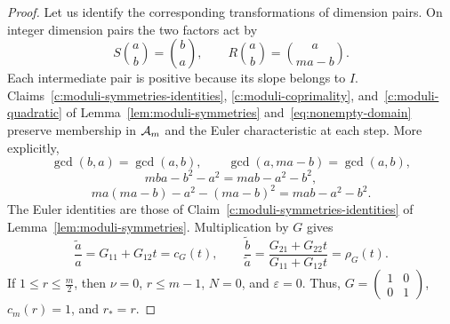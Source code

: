 \begin{proof}
Let us identify the corresponding transformations of dimension pairs.
On integer dimension pairs the two factors act by
\[
 S\binom ab=\binom ba,\qquad
 R\binom ab=\binom a{ma-b}.
\]
Each intermediate pair is positive because its slope belongs to $I$. Claims~\ref{c:moduli-symmetries-identities}, \ref{c:moduli-coprimality}, and~\ref{c:moduli-quadratic} of Lemma~\ref{lem:moduli-symmetries} and~\eqref{eq:nonempty-domain} preserve membership in $\mathcal A_m$ and the Euler characteristic at each step. More explicitly,
\[
 \gcd(b,a)=\gcd(a,b),\qquad \gcd(a,ma-b)=\gcd(a,b),
\]
\[
 m ba-b^2-a^2=mab-a^2-b^2,
\]
\[
 ma(ma-b)-a^2-(ma-b)^2=mab-a^2-b^2.
\]
The Euler identities are those of Claim~\ref{c:moduli-symmetries-identities} of Lemma~\ref{lem:moduli-symmetries}. Multiplication by $G$ gives
\[
 \frac{\widetilde a}{a}=G_{11}+G_{12}t=c_G(t),\qquad
 \frac{\widetilde b}{\widetilde a}
 =\frac{G_{21}+G_{22}t}{G_{11}+G_{12}t}=\rho_G(t).
\] If $1\le r\le \frac m2$, then $\nu=0$, $r\le m-1$, $N=0$, and $\varepsilon=0$. Thus, $G=\left(\begin{smallmatrix}1&0\\0&1\end{smallmatrix}\right)$, $c_m(r)=1$, and $r_*=r$.
\end{proof}

